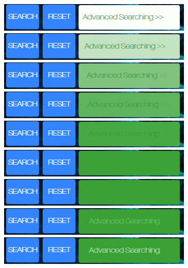 \documentclass[10pt,twoside,a4paper,titlepage]{article}
\begin{document}
	\includegraphics[width=0.7\textwidth]{cyf/Advanced_searching20.png}
	\newline	
	\includegraphics[width=0.7\textwidth]{cyf/Advanced_searching21.png}
	\newline	
	\includegraphics[width=0.7\textwidth]{cyf/Advanced_searching22.png}
	\newline	
	\includegraphics[width=0.7\textwidth]{cyf/Advanced_searching23.png}
	\newline	
	\includegraphics[width=0.7\textwidth]{cyf/Advanced_searching24.png}
	\newline	
	\includegraphics[width=0.7\textwidth]{cyf/Advanced_searching25.png}
	\newline	
	\includegraphics[width=0.7\textwidth]{cyf/Advanced_searching26.png}
	\newline	
	\includegraphics[width=0.7\textwidth]{cyf/Advanced_searching27.png}
	\newline	
	\includegraphics[width=0.7\textwidth]{cyf/Advanced_searching28.png}
\end{document}
